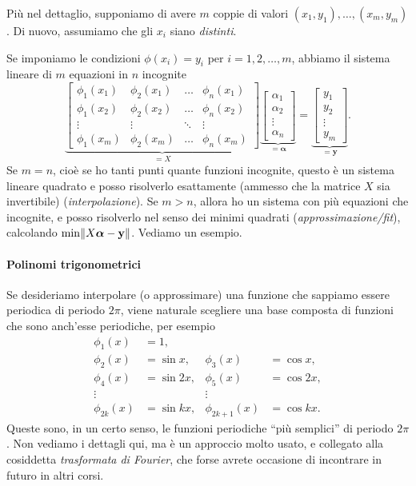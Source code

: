 \documentclass[a4paper]{report}
\DeclarePairedDelimiter{\norm}{\lVert}{\rVert}
\theoremstyle{definition}
\theoremstyle{remark}
\begin{document}
Più nel dettaglio, supponiamo di avere $m$ coppie di valori $(x_1,y_1), \dots, (x_m,y_m)$. Di nuovo, assumiamo che gli $x_i$ siano \emph{distinti}.

Se imponiamo le condizioni $\phi(x_i) = y_i$ per $i=1,2,\dots, m$, abbiamo il sistema lineare di $m$ equazioni in $n$ incognite
\[
\underbrace{
\begin{bmatrix}
    \phi_1(x_1) & \phi_2(x_1) & \dots & \phi_n(x_1)\\
    \phi_1(x_2) & \phi_2(x_2) & \dots & \phi_n(x_2)\\
    \vdots & \vdots & \ddots & \vdots\\
    \phi_1(x_m) & \phi_2(x_m) & \dots & \phi_n(x_m)
\end{bmatrix}}_{=X}
\underbrace{\begin{bmatrix}
    \alpha_1\\ \alpha_2 \\ \vdots \\ \alpha_n
\end{bmatrix}
}_{=\boldsymbol{\alpha}}
= \underbrace{\begin{bmatrix}
    y_1\\ y_2 \\ \vdots \\ y_m
\end{bmatrix}}_{=\mathbf{y}}.
\]
Se $m=n$, cioè se ho tanti punti quante funzioni incognite, questo è un sistema lineare quadrato e posso risolverlo esattamente (ammesso che la matrice $X$ sia invertibile) (\emph{interpolazione}). Se $m>n$, allora ho un sistema con più equazioni che incognite, e posso risolverlo nel senso dei minimi quadrati (\emph{approssimazione/fit}), calcolando $\min \norm{X\boldsymbol{\alpha}-\mathbf{y}}$. Vediamo un esempio.

\paragraph{Polinomi trigonometrici} Se desideriamo interpolare (o approssimare) una funzione che sappiamo essere periodica di periodo $2\pi$, viene naturale scegliere una base composta di funzioni che sono anch'esse periodiche, per esempio
\begin{align*}
\phi_1(x) &= 1,\\
\phi_2(x) &= \sin x, & \phi_3(x) &= \cos x,\\
\phi_4(x) &= \sin 2x, & \phi_5(x) &= \cos 2x,\\
\vdots & & \vdots &\\
\phi_{2k}(x) &= \sin kx, & \phi_{2k+1}(x) &= \cos kx.
\end{align*}
Queste sono, in un certo senso, le funzioni periodiche ``più semplici'' di periodo $2\pi$. Non vediamo i dettagli qui, ma è un approccio molto usato, e collegato alla cosiddetta \emph{trasformata di Fourier}, che forse avrete occasione di incontrare in futuro in altri corsi.
\end{document}
